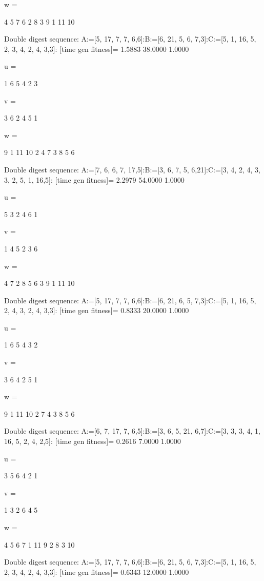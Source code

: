 w =

     4     5     7     6     2     8     3     9     1    11    10

Double digest sequence:
A:=[5, 17, 7, 7, 6,6]:B:=[6, 21, 5, 6, 7,3]:C:=[5, 1, 16, 5, 2, 3, 4, 2, 4, 3,3]:
[time gen fitness]=
    1.5883   38.0000    1.0000


u =

     1     6     5     4     2     3


v =

     3     6     2     4     5     1


w =

     9     1    11    10     2     4     7     3     8     5     6

Double digest sequence:
A:=[7, 6, 6, 7, 17,5]:B:=[3, 6, 7, 5, 6,21]:C:=[3, 4, 2, 4, 3, 3, 2, 5, 1, 16,5]:
[time gen fitness]=
    2.2979   54.0000    1.0000


u =

     5     3     2     4     6     1


v =

     1     4     5     2     3     6


w =

     4     7     2     8     5     6     3     9     1    11    10

Double digest sequence:
A:=[5, 17, 7, 7, 6,6]:B:=[6, 21, 6, 5, 7,3]:C:=[5, 1, 16, 5, 2, 4, 3, 2, 4, 3,3]:
[time gen fitness]=
    0.8333   20.0000    1.0000


u =

     1     6     5     4     3     2


v =

     3     6     4     2     5     1


w =

     9     1    11    10     2     7     4     3     8     5     6

Double digest sequence:
A:=[6, 7, 17, 7, 6,5]:B:=[3, 6, 5, 21, 6,7]:C:=[3, 3, 3, 4, 1, 16, 5, 2, 4, 2,5]:
[time gen fitness]=
    0.2616    7.0000    1.0000


u =

     3     5     6     4     2     1


v =

     1     3     2     6     4     5


w =

     4     5     6     7     1    11     9     2     8     3    10

Double digest sequence:
A:=[5, 17, 7, 7, 6,6]:B:=[6, 21, 5, 6, 7,3]:C:=[5, 1, 16, 5, 2, 3, 4, 2, 4, 3,3]:
[time gen fitness]=
    0.6343   12.0000    1.0000


